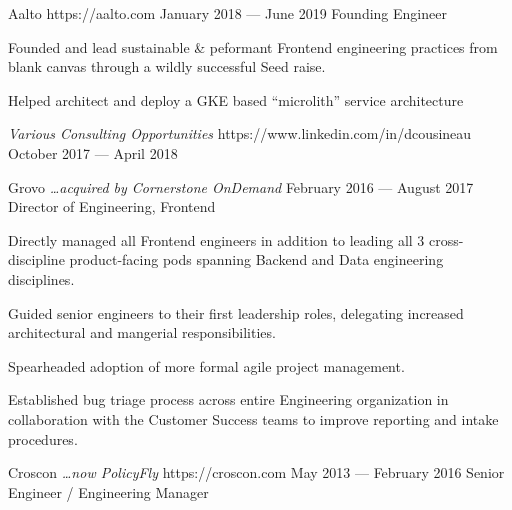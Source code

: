 \documentclass{resume}
\begin{document}
\employer
    {Aalto}
    {https://aalto.com}
    {January 2018 --- June 2019}
    {Founding Engineer}
    {\begin{jobitems}
        \item Founded and lead sustainable \& peformant Frontend engineering practices from blank canvas through a wildly successful Seed raise.
        \item Helped architect and deploy a GKE based ``microlith'' service architecture
    \end{jobitems}}
\employer
    {\emph{Various Consulting Opportunities}}
    {https://www.linkedin.com/in/dcousineau}
    {October 2017 --- April 2018}
    {}
    {}

\employer
    {Grovo \emph{\ldots acquired by Cornerstone OnDemand}}
    {}
    {February 2016 --- August 2017}
    {Director of Engineering, Frontend}
    {\begin{jobitems}
        \item Directly managed all Frontend engineers in addition to leading all 3 cross-discipline product-facing pods spanning Backend and Data engineering disciplines.
        \item Guided senior engineers to their first leadership roles, delegating increased architectural and mangerial responsibilities.
        \item Spearheaded adoption of more formal agile project management.
        \item Established bug triage process across entire Engineering organization in collaboration with the Customer Success teams to improve reporting and intake procedures.
    \end{jobitems}}
\employer
    {Croscon \emph{\ldots now PolicyFly}}
    {https://croscon.com}
    {May 2013 --- February 2016}
    {Senior Engineer / Engineering Manager}
\end{document}
